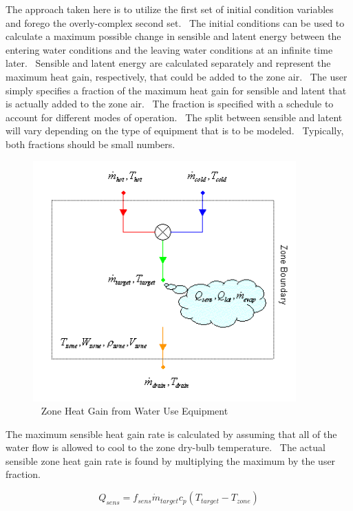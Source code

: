 The approach taken here is to utilize the first set of initial condition variables and forego the overly-complex second set.~ The initial conditions can be used to calculate a maximum possible change in sensible and latent energy between the entering water conditions and the leaving water conditions at an infinite time later.~ Sensible and latent energy are calculated separately and represent the maximum heat gain, respectively, that could be added to the zone air.~ The user simply specifies a fraction of the maximum heat gain for sensible and latent that is actually added to the zone air.~ The fraction is specified with a schedule to account for different modes of operation.~ The split between sensible and latent will vary depending on the type of equipment that is to be modeled.~ Typically, both fractions should be small numbers.

\begin{figure}[hbtp] %
\centering
\includegraphics[width=0.9\textwidth, height=0.9\textheight, keepaspectratio=true]{media/image6962.png}
\caption{  Zone Heat Gain from Water Use Equipment \protect \label{fig:zone-heat-gain-from-water-use-equipment}}
\end{figure}

The maximum sensible heat gain rate is calculated by assuming that all of the water flow is allowed to cool to the zone dry-bulb temperature.~ The actual sensible zone heat gain rate is found by multiplying the maximum by the user fraction.

\begin{equation}
{Q_{sens}} = {f_{sens}}{\dot m_{target}}{c_p}\left( {{T_{target}} - {T_{zone}}} \right)
\end{equation}

